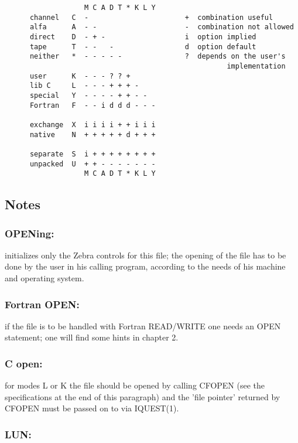 \begin{verbatim}
                   M C A D T * K L Y
      channel   C  -                       +  combination useful
      alfa      A  - -                     -  combination not allowed
      direct    D  - + -                   i  option implied
      tape      T  - -   -                 d  option default
      neither   *  - - - - -               ?  depends on the user's
                                                     implementation
      user      K  - - - ? ? +
      lib C     L  - - - + + + -
      special   Y  - - - - + + - -
      Fortran   F  - - i d d d - - -

      exchange  X  i i i i + + i i i
      native    N  + + + + + d + + +

      separate  S  i + + + + + + + +
      unpacked  U  + + - - - - - - -
                   M C A D T * K L Y

\end{verbatim}

\subsection*{Notes}

\subsubsection*{OPENing:}

 initializes only the Zebra controls for this file;
the opening of the file has to be done by the user in his calling
program, according to the needs of his machine and operating system.

\subsubsection*{Fortran OPEN:}

if the file is to be handled with Fortran READ/WRITE one needs an
OPEN statement; one will find some hints in chapter 2.

\subsubsection*{C open:}

for modes L or K the file should be opened by calling CFOPEN
(see the specifications at the end of this paragraph)
and the 'file pointer' returned by CFOPEN must be passed
on to  via IQUEST(1).

\subsubsection*{LUN:}


